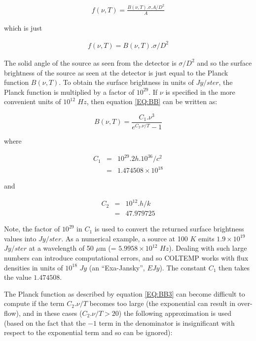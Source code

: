 \begin{eqnarray*}
f( \nu, T ) = \frac{B( \nu, T ).\sigma.A/D^{2}}{A}
\end{eqnarray*}

which is just 

\begin{eqnarray*}
f( \nu, T ) = B( \nu, T ).\sigma/D^{2}
\end{eqnarray*}

The solid angle of the source as seen from the detector is $\sigma/D^{2}$ and so
the surface brightness of the source as seen at the detector is just equal to
the Planck function $B(\nu,T)$. To obtain the surface brightness in units of
$Jy/ster$, the Planck function is multiplied by a factor of $10^{29}$. 
If $\nu$ is specified in the more convenient units of $10^{12}$ $Hz$, then
equation \ref{EQ:BB} can be written as:

\begin{equation}
\label{EQ:BB3}
B( \nu, T ) = \frac{C_{1}.\nu^{3}}{e^{C_{2}.\nu/T}-1}
\end{equation}

where

\begin{eqnarray*}
C_{1} & = & 10^{29}.2h.10^{36}/c^{2}\\
      & = & 1.474508 \times 10^{18}
\end{eqnarray*}

and 

\begin{eqnarray*}
C_{2} & = & 10^{12}.h/k\\
      & = & 47.979725
\end{eqnarray*}

Note, the factor of $10^{29}$ in $C_{1}$ is used to convert the returned surface
brightness values into $Jy/ster$. As a numerical example, a source at 100 $K$
emits $1.9 \times 10^{19}$ $Jy/ster$ at a wavelength of 50 $\mu$m (= $5.9958
\times 10^{12}$ $Hz$). Dealing with such large numbers can introduce
computational errors, and so {\small COLTEMP} works with flux densities in units
of $10^{18}$ $Jy$ (an ``Exa-Jansky'', $EJy$). The constant $C_{1}$ then takes
the value $1.474508$. 

The Planck function as described by equation \ref{EQ:BB3} can become difficult
to compute if the term $C_{2}.\nu/T$ becomes too large (the exponential can
result in over-flow), and in these cases ($C_{2}.\nu/T>20$) the following
approximation is used (based on the fact that the $-1$ term in the denominator
is insignificant with respect to the exponential term and so can be ignored): 

